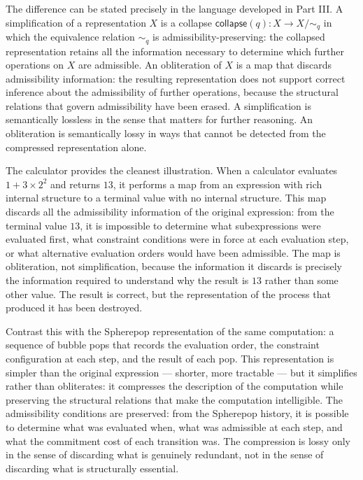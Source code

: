\documentclass[12pt,openany]{book}
\theoremstyle{plain}
\theoremstyle{definition}
\theoremstyle{remark}
\newcommand{\scollapse}[1]{\mathsf{collapse}\!\left(#1\right)}
\begin{document}
The difference can be stated precisely in the language developed in Part III. A simplification of a representation $X$ is a collapse $\scollapse{q} : X \to X/{\sim_q}$ in which the equivalence relation $\sim_q$ is admissibility-preserving: the collapsed representation retains all the information necessary to determine which further operations on $X$ are admissible. An obliteration of $X$ is a map that discards admissibility information: the resulting representation does not support correct inference about the admissibility of further operations, because the structural relations that govern admissibility have been erased. A simplification is semantically lossless in the sense that matters for further reasoning. An obliteration is semantically lossy in ways that cannot be detected from the compressed representation alone.

The calculator provides the cleanest illustration. When a calculator evaluates $1 + 3 \times 2^2$ and returns $13$, it performs a map from an expression with rich internal structure to a terminal value with no internal structure. This map discards all the admissibility information of the original expression: from the terminal value $13$, it is impossible to determine what subexpressions were evaluated first, what constraint conditions were in force at each evaluation step, or what alternative evaluation orders would have been admissible. The map is obliteration, not simplification, because the information it discards is precisely the information required to understand why the result is $13$ rather than some other value. The result is correct, but the representation of the process that produced it has been destroyed.

Contrast this with the Spherepop representation of the same computation: a sequence of bubble pops that records the evaluation order, the constraint configuration at each step, and the result of each pop. This representation is simpler than the original expression — shorter, more tractable — but it simplifies rather than obliterates: it compresses the description of the computation while preserving the structural relations that make the computation intelligible. The admissibility conditions are preserved: from the Spherepop history, it is possible to determine what was evaluated when, what was admissible at each step, and what the commitment cost of each transition was. The compression is lossy only in the sense of discarding what is genuinely redundant, not in the sense of discarding what is structurally essential.
\end{document}
